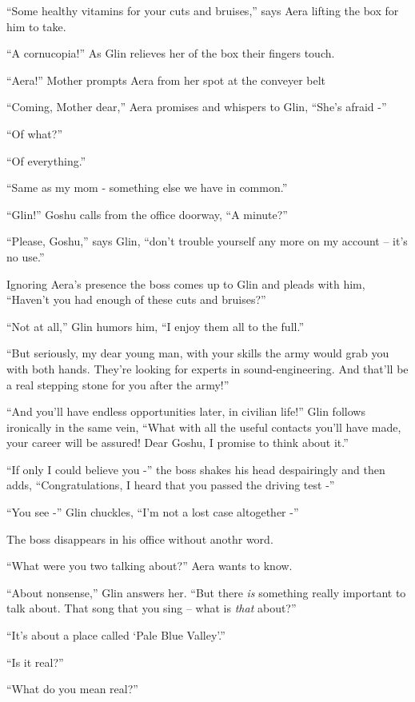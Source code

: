 \documentclass[twoside,11pt]{book}
\begin{document}
``Some healthy vitamins for your cuts and bruises,'' says Aera lifting the box for him to
take.

``A cornucopia!'' As Glin relieves her of the box their fingers touch.

``Aera!'' Mother prompts Aera from her spot at the conveyer belt

``Coming, Mother dear,'' Aera promises and whispers to Glin, ``She's afraid
-''

``Of what?''

``Of everything.''

``Same as my mom - something else we have in common.''

``Glin!'' Goshu calls from the office doorway, ``A minute?''

``Please, Goshu,'' says Glin, ``don't trouble yourself any more on my account --
it's no use.''

Ignoring Aera's presence the boss comes up to Glin and pleads with him, ``Haven't you had enough of these
cuts and bruises?''

``Not at all,'' Glin humors him, ``I enjoy them all to the full.''

``But seriously, my dear young man, with your skills the army would grab you with both hands. They're
looking for experts in sound-engineering. And that'll be a real stepping stone for you after the army!''

``And you'll have endless opportunities later, in civilian life!'' Glin follows
ironically in the same vein, ``What with all the useful contacts you'll have made, your
career will be assured!  Dear Goshu, I promise to think about it.''

``If only I could believe you -'' the boss shakes his head despairingly and
then adds, ``Congratulations, I heard that you passed the driving test -''

``You see -'' Glin chuckles, ``I'm not a lost case altogether
-''

The boss disappears in his office without anothr word.

``What were you two talking about?'' Aera wants to know.

``About nonsense,'' Glin answers her. ``But there \textit{is} something really
important to talk about. That song that you sing -- what is \textit{that} about?''

``It's about a place called `Pale Blue Valley'.''

``Is it real?''

``What do you mean real?''
\end{document}
